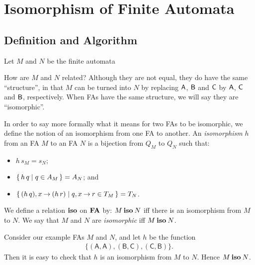 \section{Isomorphism of Finite Automata}
\label{IsomorphismOfFiniteAutomata}

%
%

\subsection{Definition and Algorithm}

Let $M$ and $N$ be the finite automata
\begin{center}

\end{center}
How are $M$ and $N$ related?
Although they are not equal, they do have the same
``structure'', in that $M$ can be turned into $N$ by replacing
$\mathsf{A}$, $\mathsf{B}$ and $\mathsf{C}$ by $\mathsf{A}$, $\mathsf{C}$ and $\mathsf{B}$, respectively.
When FAs have the same structure, we will say they are ``isomorphic''.

In order to say more formally what it means for two FAs to be
isomorphic, we define the notion of an isomorphism from one FA to
another.  An {\em isomorphism}
%
%
$h$ from an FA $M$ to an FA $N$ is a bijection from $Q_M$ to $Q_N$
such that:
\begin{itemize}
\item $h\,s_M = s_N$;

\item $\{ \, h\,q \mid q\in A_M \, \} = A_N$; and

\item $\{ \, (h\,q), x\mathbin{\to} (h\,r) \mid q,x\mathbin{\to} r\in T_M \, \} =
T_N$.
\end{itemize}
We define a relation $\mathbin{\mathbf{iso}}$ on $\mathbf{FA}$ by: $M\mathbin{\mathbf{iso}} N$
%
%
%
iff there
is an isomorphism from $M$ to $N$.  We say that $M$ and $N$ are
{\em isomorphic\/}
%
%
%
iff $M\mathbin{\mathbf{iso}} N$.

Consider our example FAs $M$ and $N$, and
let $h$ be the function
\begin{gather*}
\mathsf{\{(A, A), (B, C), (C, B)\}}.
\end{gather*}
Then it is easy to check that $h$ is an isomorphism from $M$ to $N$.
Hence $M\mathbin{\mathbf{iso}} N$.


